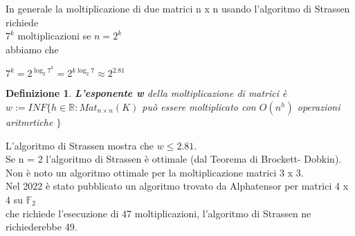 \documentclass[a4paper,12pt]{article}
\theoremstyle{def}
\newtheorem*{definition}{Definizione}
\theoremstyle{prop}
\theoremstyle{esempio}
\theoremstyle{dimostrazione}
\theoremstyle{teo}
\theoremstyle{osservazione}
\begin{document}
In generale la moltiplicazione di due matrici n x n usando l'algoritmo di Strassen richiede\\
\(7^k\) moltiplicazioni se \(n = 2^k\)\\
abbiamo che
\begin{center}
    \(7^k = 2^{\log_2 7^k}=2^{k \log_2 7} \approx 2^{2.81}\)
\end{center}

\begin{definition}
    \textbf{L'esponente w} della moltiplicazione di matrici è\\
    \(w := INF\{ h \in \mathbb{R} : Mat_{n \times n}(K)\) può essere moltiplicato con \(O(n^h)\) operazioni aritmrtiche \(\}\)\\
\end{definition}

\vspace{\baselineskip}L'algoritmo di Strassen mostra che \(w \leq 2.81\).\\
Se n = 2 l'algoritmo di Strassen è ottimale (dal Teorema di Brockett- Dobkin).\\
Non è noto un algoritmo ottimale per la moltiplicazione matrici 3 x 3.\\
Nel 2022 è stato pubblicato un algoritmo trovato da Alphatensor per matrici 4 x 4 su \(\mathbb{F}_2\)\\
che richiede l'esecuzione di 47 moltiplicazioni, l'algoritmo di Strassen ne richiederebbe 49.\\
\end{document}
